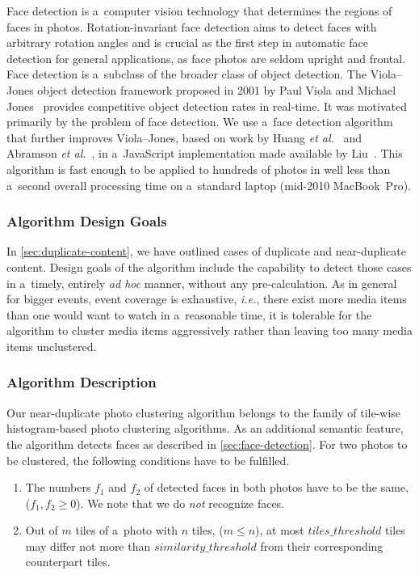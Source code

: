 Face detection is a~computer vision technology
that determines the regions of faces in photos.
Rotation-invariant face detection aims to detect faces with arbitrary
rotation angles and is crucial as the first step in automatic face detection
for general applications, as face photos are seldom upright and frontal.
Face detection is a~subclass of the broader class of object detection.
The Viola--Jones object detection framework proposed in 2001
by Paul Viola and Michael
Jones~\cite{viola2001objectdetection,viola2004robust}
provides competitive object detection rates in real-time.
It was motivated primarily by the problem of face detection.
We use a~face detection algorithm that further improves Viola--Jones,
based on work by Huang \emph{et al.}~\cite{huang2007facedetection}
and Abramson \emph{et al.}~\cite{abramson2007yef},
in a~JavaScript implementation made available by Liu~\cite{liu2012facedetection}.
This algorithm is fast enough to be applied to hundreds of photos
in well less than a~second overall processing time on a~standard laptop
(mid-2010 MacBook~Pro).

\subsubsection{Algorithm Design Goals}

In \autoref{sec:duplicate-content}, we have outlined
cases of duplicate and near-duplicate content.
Design goals of the algorithm include
the capability to detect those cases
in a~timely, entirely \emph{ad hoc} manner, without any pre-calculation.
As in general for bigger events, event coverage is exhaustive, \emph{i.e.},
there exist more media items
than one would want to watch in a~reasonable time,
it is tolerable for the algorithm to cluster media items aggressively
rather than leaving too many media items unclustered.

\subsubsection{Algorithm Description}

Our near-duplicate photo clustering algorithm belongs to the family of
tile-wise histogram-based photo clustering algorithms.
As an additional semantic feature, the algorithm detects faces
as described in \autoref{sec:face-detection}.
For two photos to be clustered,
the following conditions have to be fulfilled.

\begin{enumerate}
  \item The numbers $f_1$ and $f_2$ of detected faces in both photos
    have to be the same, ($f_1, f_2 \geq 0$).
    We note that we do \emph{not} recognize faces.
  \item Out of $m$ tiles of a~photo with $n$ tiles, ($m \leq n$),
    at most $tiles\_threshold$ tiles may differ not more than $similarity\_threshold$
    from their corresponding counterpart tiles.
\end{enumerate}

